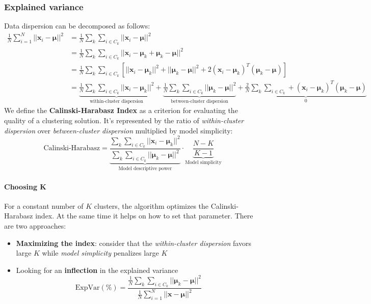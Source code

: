 \subsubsection{Explained variance}
Data dispersion can be decomposed as follows:
\begin{align*}
	\frac{1}{N} \sum_{i=1}^{N} \lvert\lvert \mathbf{x}_i - \mathbf{\mu} \rvert\rvert^2 & = \frac{1}{N} \sum_k \sum_{i\in C_k} \lvert\lvert \mathbf{x}_i - \mathbf{\mu} \rvert\rvert^2\\
	& = \frac{1}{N} \sum_k \sum_{i\in C_k} \lvert\lvert \mathbf{x}_i - \mathbf{\mu}_k + \mathbf{\mu}_k - \mathbf{\mu} \rvert\rvert^2 \\
	& = \frac{1}{N} \sum_k \sum_{i\in C_k} [\lvert\lvert \mathbf{x}_i - \mathbf{\mu}_k\rvert\rvert^2 + \lvert\lvert \mathbf{\mu}_k - \mathbf{\mu} \rvert\rvert^2 +2(\mathbf{x}_i -\mathbf{\mu}_k)^T(\mathbf{\mu}_k - \mathbf{\mu})]\\
	& = \underbrace{\frac{1}{N} \sum_k \sum_{i\in C_k} \lvert\lvert \mathbf{x}_i - \mathbf{\mu}_k\rvert\rvert^2}_{\text{within-cluster dispersion}} + \underbrace{\frac{1}{N} \sum_k \sum_{i\in C_k} \lvert\lvert \mathbf{\mu}_k - \mathbf{\mu} \rvert\rvert^2}_{\text{between-cluster dispersion}} + \underbrace{\frac{2}{N} \sum_k \sum_{i\in C_k} +(\mathbf{x}_i -\mathbf{\mu}_k)^T(\mathbf{\mu}_k - \mathbf{\mu})}_{0}
\end{align*}
We define the \textbf{Calinski-Harabasz Index} as a criterion for evaluating the quality of a clustering solution. It's represented by the ratio of \textit{within-cluster dispersion} over \textit{between-cluster dispersion} multiplied by model simplicity:
\begin{equation}
	\text{Calinski-Harabasz}=\underbrace{\frac{\sum_k \sum_{i\in C_k} \lvert\lvert \mathbf{x}_i - \mathbf{\mu}_k\rvert\rvert^2}{\sum_k \sum_{i\in C_k} \lvert\lvert \mathbf{\mu}_k - \mathbf{\mu} \rvert\rvert^2}}_{\text{Model descriptive power}}\cdot \underbrace{\frac{N- K}{K-1}}_{\text{Model simplicity}}
\end{equation}
\paragraph{Choosing K} For a constant number of $K$ clusters, the algorithm optimizes the Calinski-Harabasz index. At the same time it helps on how to set that parameter. There are two approaches:
\begin{itemize}
	\item \textbf{Maximizing the index}: consider that the \textit{within-cluster dispersion} favors large $K$ while \textit{model simplicity} penalizes large $K$
	\item Looking for an \textbf{inflection} in the explained variance
	\begin{equation}
		\text{ExpVar}(\%) = \frac{\frac{1}{N} \sum_k \sum_{i\in C_k} \lvert\lvert \mathbf{\mu}_k - \mathbf{\mu} \rvert\rvert^2}{{\frac{1}{N}\sum_{i=1}^N \lvert\lvert \mathbf{x} - \mathbf{\mu}\rvert\rvert^2}}
	\end{equation}
\end{itemize}


